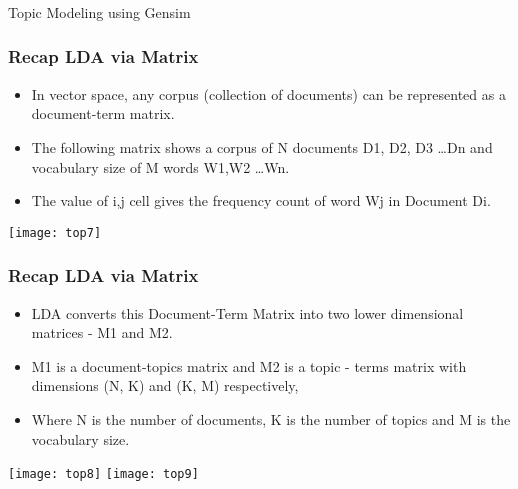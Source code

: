 \begin{frame}[fragile]\frametitle{}

\begin{center}
{\Large Topic Modeling using Gensim}
\end{center}
\end{frame}


\begin{frame}[fragile]\frametitle{Recap LDA via Matrix}
  \begin{itemize}
\item In vector space, any corpus (collection of documents) can be represented as a document-term matrix. 
\item The following matrix shows a corpus of N documents D1, D2, D3 \ldots Dn and vocabulary size of M words W1,W2 \ldots Wn. 
\item The value of i,j cell gives the frequency count of word Wj in Document Di.
  \end{itemize}

\begin{center}
\texttt{[image: top7]}
\end{center}

\end{frame}

\begin{frame}[fragile]\frametitle{Recap LDA via Matrix}
  \begin{itemize}
\item LDA converts this Document-Term Matrix into two lower dimensional matrices - M1 and M2.
\item  M1 is a document-topics matrix and M2 is a topic - terms matrix with dimensions (N,  K) and (K, M) respectively, 
\item Where N is the number of documents, K is the number of topics and M is the vocabulary size.
  \end{itemize}

\begin{center}
\texttt{[image: top8]}
\texttt{[image: top9]}
\end{center}
\end{frame}

